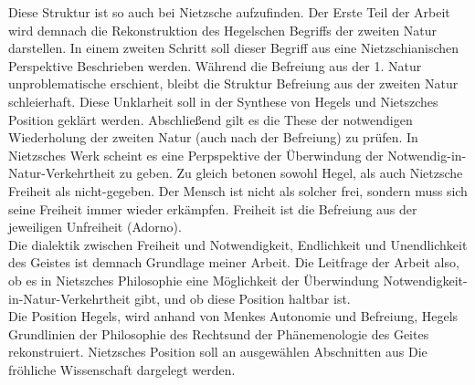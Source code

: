 \documentclass[a4paper, 12pt]{article}
\begin{document}
Diese Struktur ist so auch bei Nietzsche aufzufinden. 
Der Erste Teil der Arbeit wird demnach die Rekonstruktion des Hegelschen Begriffs der zweiten Natur darstellen. 
In einem zweiten Schritt soll dieser Begriff aus eine Nietzschianischen Perspektive Beschrieben werden. 
Während die Befreiung aus der 1. Natur unproblematische erschient, bleibt die Struktur Befreiung aus der zweiten Natur schleierhaft.
Diese Unklarheit soll in der Synthese von Hegels und Nietszches Position geklärt werden. 
Abschließend gilt es die These der notwendigen Wiederholung der zweiten Natur (auch nach der Befreiung) zu prüfen. 
In Nietzsches Werk scheint es eine Perpspektive der Überwindung der Notwendig-in-Natur-Verkehrtheit zu geben. 
Zu gleich betonen sowohl Hegel, als auch Nietzsche Freiheit als nicht-gegeben. 
Der Mensch ist nicht als solcher frei, sondern muss sich seine Freiheit immer wieder erkämpfen.
Freiheit ist die Befreiung aus der jeweiligen Unfreiheit (Adorno).\\
Die dialektik zwischen Freiheit und Notwendigkeit, Endlichkeit und Unendlichkeit des Geistes ist demnach Grundlage meiner Arbeit.
Die Leitfrage der Arbeit also, ob es in Nietszches Philosophie eine Möglichkeit der Überwindung Notwendigkeit-in-Natur-Verkehrtheit gibt, und ob diese Position haltbar ist.\\
Die Position Hegels, wird anhand von Menkes \glqq Autonomie und Befreiung\grqq, Hegels \glqq Grundlinien der Philosophie des Rechts\grqq und der \glqq Phänemenologie des Geites\grqq{} rekonstruiert.
Nietzsches Position soll an ausgewählen Abschnitten aus \glqq Die fröhliche Wissenschaft\grqq{} dargelegt werden.
\end{document}
